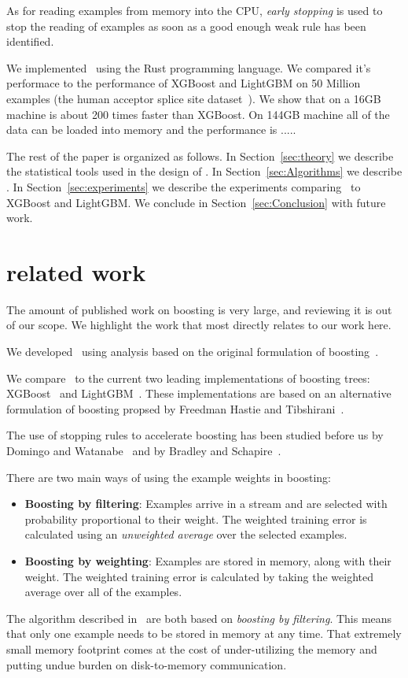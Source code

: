 As for reading examples from memory into the CPU, {\em early stopping}
is used to stop the reading of examples as soon as a good enough weak
rule has been identified.

We implemented \Sparrow\ using the Rust programming language. We
compared it's performace to the performance of XGBoost and LightGBM on
50 Million examples (the human acceptor splice site
dataset~\cite{sonnenburg_coffin:_2010, agarwal_reliable_2014}). We
show that on a 16GB machine \Sparrow is about 200 times faster than
XGBoost. On 144GB machine all of the data can be loaded into memory
and the performance is .....

The rest of the paper is organized as follows. In Section~\ref{sec:theory} we
describe the statistical tools used in the design of \Sparrow. In
Section~\ref{sec:Algorithms} we describe \Sparrow. In Section~\ref{sec:experiments} we describe
the experiments comparing \Sparrow\ to XGBoost and LightGBM. We
conclude in Section~\ref{sec:Conclusion} with %
future work.

\section{related work}

The amount of published work on boosting is very large, and reviewing
it is out of our scope. We highlight the work that most directly
relates to our work here.

We developed \Sparrow\ using analysis based on the original formulation of
boosting~\cite{original, confidence-rated-boosting, adtrees, Book}.

We compare \Sparrow\ to the current two leading implementations
of boosting trees: XGBoost~\cite{chen_xgboost:_2016} and
LightGBM~\cite{ke_lightgbm:_2017}.
These implementations are based on an alternative formulation of
boosting propsed by Freedman Hastie and Tibshirani~\cite{}.

The use of stopping rules to accelerate boosting has been studied 
before us by Domingo and Watanabe~\cite{domingo_scaling_2000} and by
Bradley and Schapire~\cite{bradley_filterboost:_2007}.


\iffalse

There are two main ways of using the example weights in boosting:
\begin{itemize}
\item {\bf Boosting by filtering}: Examples arrive in a stream and are
  selected with probability proportional to their weight. The weighted
  training error is calculated using an {\em unweighted average} over
  the selected examples.
\item {\bf Boosting by weighting}: Examples are stored in memory,
  along with their weight. The weighted training error is calculated
  by taking the weighted average over all of the examples.
\end{itemize}
The algorithm described
in~\cite{domingo_scaling_2000,bradley_filterboost:_2007} are both
based on {\em boosting by filtering}. This means that only one example
needs to be stored in memory at any time. That extremely small memory
footprint comes at the cost of under-utilizing the memory and putting
undue burden on disk-to-memory communication.

